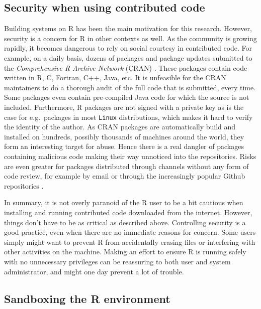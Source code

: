 \documentclass{jss}
\newcommand{\R}{\textsf{R}\xspace}
\newcommand{\Java}{\textsf{Java}\xspace}
\newcommand{\C}{\textsf{C}\xspace}
\newcommand{\Cpp}{\textsf{C++}\xspace}
\newcommand{\Fortran}{\textsf{Fortran}\xspace}
\newcommand{\Linux}{\texttt{Linux}\xspace}
\begin{document}
\subsection{Security when using contributed code}


Building systems on \R has been the main motivation for this research.
However, security is a concern for \R in other contexts as
well. As the community is growing rapidly, it becomes dangerous
to rely on social courtesy in contributed code. For example, on a daily
basis, dozens of packages and package updates submitted to the
\emph{Comprehensive R Archive Network} (CRAN) \citep{ripleycran}.
These packages contain code written in \R, \C, \Fortran, \Cpp, \Java, etc. It
is unfeasible for the CRAN maintainers to do a thorough audit of the
full code that is submitted, every time. Some packages even contain pre-compiled \Java code for which the source is not included. Furthermore, \R packages
are not signed with a private key as is the case for e.g.\ packages in most
\Linux distributions, which makes it hard to verify the identity of the author. As
CRAN packages are automatically build and installed on hundreds, possibly thousands
of machines around the world, they form an interesting target for abuse.
Hence there is a real dangler of packages containing malicious code making
their way unnoticed into the repositories. Risks are even greater for packages 
distributed through channels without any form of code review, for example by
email or through the increasingly popular Github repositories
\citep{torvalds2010git,dabbish2012social}.

In summary, it is not overly paranoid of the \R user to be a bit
cautious when installing and running contributed code downloaded from the
internet. However, things don't have to be as critical as described above.
Controlling security is a good practice, even when there are no immediate reasons
for concern. Some users simply might want to prevent \R from accidentally erasing
files or interfering with other activities on the machine. Making an effort to ensure
\R is running safely with no unnecessary privileges can be reassuring 
to both user and system administrator, and might one day prevent a lot of trouble.

\subsection[Sandboxing the R environment]{Sandboxing the \R environment}
\end{document}
